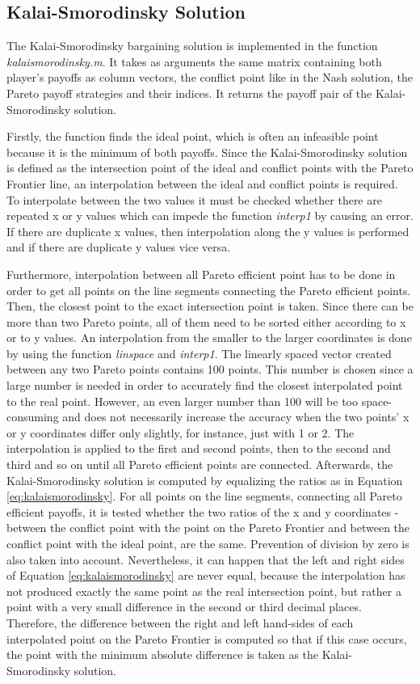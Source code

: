 \subsection{Kalai-Smorodinsky Solution}
The Kalai-Smorodinsky bargaining solution is implemented in the function \textit{kalaismorodinsky.m}. It takes as arguments the same matrix containing both player's payoffs as column vectors, the conflict point like in the Nash solution, the Pareto payoff strategies and their indices. It returns the payoff pair of the Kalai-Smorodinsky solution.

Firstly, the function finds the ideal point, which is often an infeasible point because it is the minimum of both payoffs. Since the Kalai-Smorodinsky solution is defined as the intersection point of the ideal and conflict points with the Pareto Frontier line, an interpolation between the ideal and conflict points is required. To interpolate between the two values it must be checked whether there are repeated x or y values which can impede the function \textit{interp1} by causing an error. If there are duplicate x values, then interpolation along the y values is performed and if there are duplicate y values vice versa. 

Furthermore, interpolation between all Pareto efficient point has to be done in order to get all points on the line segments connecting the Pareto efficient points. Then, the closest point to the exact intersection point is taken. Since there can be more than two Pareto points, all of them need to be sorted either according to x or to y values. An interpolation from the smaller to the larger coordinates is done by using the function \textit{linspace} and \textit{interp1}. The linearly spaced vector created between any two Pareto points contains 100 points. This number is chosen since a large number is needed in order to accurately find the closest interpolated point to the real point. However, an even larger number than 100 will be too space-consuming and does not necessarily increase the accuracy when the two points' x or y coordinates differ only slightly, for instance, just with 1 or 2. The interpolation is applied to the first and second points, then to the second and third and so on until all Pareto efficient points are connected. Afterwards, the Kalai-Smorodinsky solution is computed by equalizing the ratios as in Equation \ref{eq:kalaismorodinsky}. For all points on the line segments, connecting all Pareto efficient payoffs, it is tested whether the two ratios of the x and y coordinates - between the conflict point with the point on the Pareto Frontier and between the conflict point with the ideal point, are the same. Prevention of division by zero is also taken into account. Nevertheless, it can happen that the left and right sides of Equation \ref{eq:kalaismorodinsky} are never equal, because the interpolation has not produced exactly the same point as the real intersection point, but rather a point with a very small difference in the second or third decimal places. Therefore, the difference between the right and left hand-sides of each interpolated point on the Pareto Frontier is computed so that if this case occurs, the point with the minimum absolute difference is taken as the Kalai-Smorodinsky solution.

